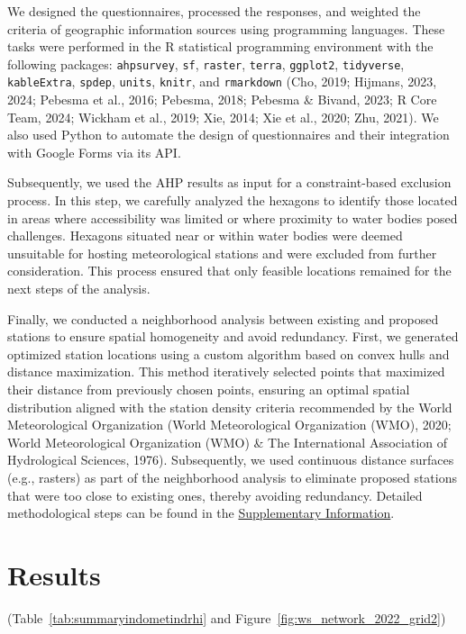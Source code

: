 \documentclass[spanish]{article}
\begin{document}
We designed the questionnaires, processed the responses, and weighted
the criteria of geographic information sources using programming
languages. These tasks were performed in the R statistical programming
environment with the following packages: \texttt{ahpsurvey},
\texttt{sf}, \texttt{raster}, \texttt{terra}, \texttt{ggplot2},
\texttt{tidyverse}, \texttt{kableExtra}, \texttt{spdep}, \texttt{units},
\texttt{knitr}, and \texttt{rmarkdown} (Cho, 2019; Hijmans, 2023, 2024;
Pebesma et al., 2016; Pebesma, 2018; Pebesma \& Bivand, 2023; R Core
Team, 2024; Wickham et al., 2019; Xie, 2014; Xie et al., 2020; Zhu,
2021). We also used Python to automate the design of questionnaires and
their integration with Google Forms via its API.

Subsequently, we used the AHP results as input for a constraint-based
exclusion process. In this step, we carefully analyzed the hexagons to
identify those located in areas where accessibility was limited or where
proximity to water bodies posed challenges. Hexagons situated near or
within water bodies were deemed unsuitable for hosting meteorological
stations and were excluded from further consideration. This process
ensured that only feasible locations remained for the next steps of the
analysis.

Finally, we conducted a neighborhood analysis between existing and
proposed stations to ensure spatial homogeneity and avoid redundancy.
First, we generated optimized station locations using a custom algorithm
based on convex hulls and distance maximization. This method iteratively
selected points that maximized their distance from previously chosen
points, ensuring an optimal spatial distribution aligned with the
station density criteria recommended by the World Meteorological
Organization (World Meteorological Organization (WMO), 2020; World
Meteorological Organization (WMO) \& The International Association of
Hydrological Sciences, 1976). Subsequently, we used continuous distance
surfaces (e.g., rasters) as part of the neighborhood analysis to
eliminate proposed stations that were too close to existing ones,
thereby avoiding redundancy. Detailed methodological steps can be found
in the \protect\hyperlink{infosupl}{Supplementary Information}.

\hypertarget{results}{%
\section{Results}\label{results}}

(Table~\ref{tab:summaryindometindrhi} and
Figure~\ref{fig:ws_network_2022_grid2})
\end{document}
